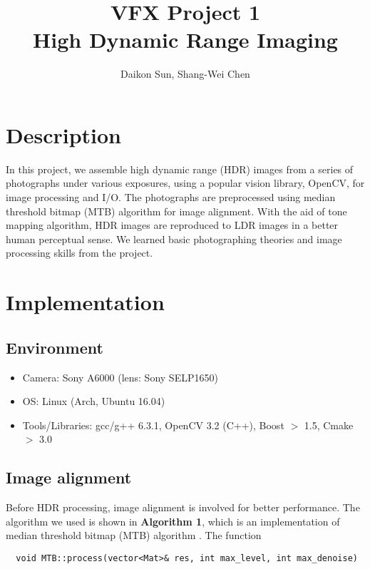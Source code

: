 \documentclass[11pt]{article}
\title{\bf{VFX Project 1\\\large{High Dynamic Range Imaging}}\vspace{-10pt}}
\author{Daikon Sun, Shang-Wei Chen}
\date{}
\begin{document}
\maketitle
\section{Description}
In this project, we assemble high dynamic range (HDR) images from a series of photographs under various exposures, using a popular vision library, OpenCV, for image processing and I/O. The photographs are preprocessed using median threshold bitmap (MTB) algorithm for image alignment. With the aid of tone mapping algorithm, HDR images are reproduced to LDR images in a better human perceptual sense. We learned basic photographing theories and image processing skills from the project. 

\section{Implementation}
\subsection{Environment}
\begin{itemize}
	\itemsep=-2pt
	\item Camera: Sony A6000 (lens: Sony SELP1650)
	\item OS: Linux (Arch, Ubuntu 16.04)
	\item Tools/Libraries: gcc/g++ 6.3.1, OpenCV 3.2 (C++), Boost $>$ 1.5, Cmake $>$ 3.0
\end{itemize}

\subsection{Image alignment}
Before HDR processing, image alignment is involved for better performance. The algorithm we used is shown in \textbf{Algorithm 1}, which is an implementation of median threshold bitmap (MTB) algorithm \cite{ref:Ward}. The function 

\begin{lstlisting}
  void MTB::process(vector<Mat>& res, int max_level, int max_denoise)
\end{lstlisting}
\end{document}
